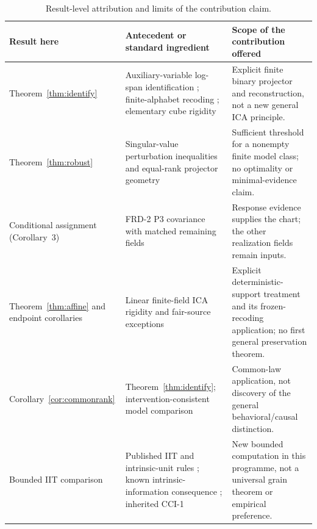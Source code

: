 \documentclass[11pt]{article}
\theoremstyle{definition}\newtheorem{definition}[theorem]{Definition}
\theoremstyle{remark}\newtheorem{remark}[theorem]{Remark}
\begin{document}
\begin{table}[!htbp]
\centering\small
\caption{Result-level attribution and limits of the contribution claim.}\label{tab:antecedents}
\renewcommand{\arraystretch}{1.18}
\begin{tabularx}{\textwidth}{@{}>{\raggedright\arraybackslash}p{}>{\raggedright\arraybackslash}p{}>{\raggedright\arraybackslash}X@{}}
\toprule
Result here & Antecedent or standard ingredient & Scope of the contribution offered\\\midrule
Theorem~\ref{thm:identify} & Auxiliary-variable log-span identification \cite{hyvarinen,khemakhem}; finite-alphabet recoding \cite{painsky}; elementary cube rigidity & Explicit finite binary projector and reconstruction, not a new general ICA principle.\\
Theorem~\ref{thm:robust} & Singular-value perturbation inequalities and equal-rank projector geometry & Sufficient threshold for a nonempty finite model class; no optimality or minimal-evidence claim.\\
Conditional assignment (Corollary~3) & FRD-2 P3 covariance with matched remaining fields \cite{frd2} & Response evidence supplies the chart; the other realization fields remain inputs.\\
Theorem~\ref{thm:affine} and endpoint corollaries & Linear finite-field ICA rigidity and fair-source exceptions \cite{yeredor} & Explicit deterministic-support treatment and its frozen-recoding application; no first general preservation theorem.\\
Corollary~\ref{cor:commonrank} & Theorem~\ref{thm:identify}; intervention-consistent model comparison \cite{rubenstein,beckers} & Common-law application, not discovery of the general behavioral/causal distinction.\\
Bounded IIT comparison & Published IIT and intrinsic-unit rules \cite{iit2023,intrinsic}; known intrinsic-information consequence \cite{mayner}; inherited CCI-1 \cite{cci} & New bounded computation in this programme, not a universal grain theorem or empirical preference.\\
\bottomrule
\end{tabularx}
\end{table}
\end{document}
